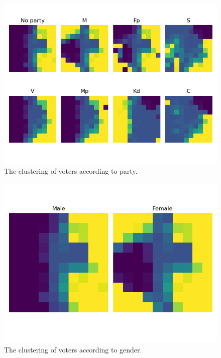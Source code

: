 \documentclass[a4paper]{article}
\begin{document}
\begin{figure}[ht]
  \includegraphics[width=\linewidth]{figures/parties.png}
  \caption{The clustering of voters according to party.}
    \label{fig:parties}
\end{figure}

\begin{figure}[ht]
  \includegraphics[width=\linewidth]{figures/genders.png}
  \caption{The clustering of voters according to gender.}
  \label{fig:genders}
\end{figure}
\end{document}
